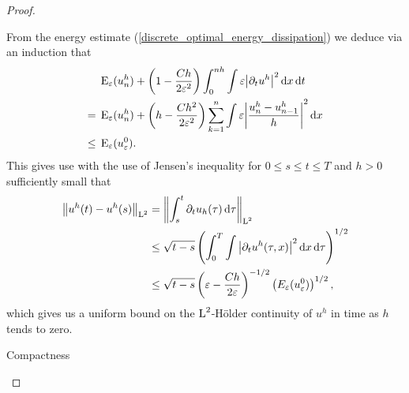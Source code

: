 \begin{proof}
\begin{description}[wide=0pt]
		From the energy estimate (\ref{discrete_optimal_energy_dissipation}) we deduce via an induction that
		\begin{align}
			& \operatorname{E}_{ \varepsilon } ( u_{ n }^{ h } )
			+
			\left(
			1
			-
			\frac{ C h  }{ 2 \varepsilon^{ 2 } }
			\right)
			\int_{ 0 }^{ n h }
			\int
			\varepsilon
			\abs{ \partial_{ t } u^{ h } }^{ 2 }
			\dd{ x }
			\dd{ t }
			\notag
			\\
			={} &
			\operatorname{E}_{ \varepsilon } ( u_{ n }^{ h } )
			+
			\left(
			h - \frac{ C h^{ 2 }}{ 2 \varepsilon^{ 2 } }
			\right)
			\sum_{k = 1 }^{ n }
			\int
			\varepsilon
			\abs{
				\frac{ u_{ n }^{ h } - u_{ n - 1 }^{ h } }{ h }
			}^{ 2 }
			\dd{ x }
			\notag
			\\
			\label{energy_and_time_derivative_bound}
			\leq {} &
			\operatorname{E}_{ \varepsilon } ( u_{ \varepsilon }^{ 0 } ).
		\end{align}
		This gives use with the use of Jensen's inequality for $ 0\leq s \leq t \leq T $ and $ h > 0 $ sufficiently small that
		\begin{align}
			\norm{ u^{ h } ( t ) - u^{ h } ( s ) }_{ \operatorname{L}^{ 2 } }
			& =
			\norm{ 
				\int_{ s }^{ t }
				\partial_{ t } u_{ h } ( \tau )
				\dd{ \tau }
			}_{ \operatorname{L}^{ 2 } }
			\notag
			\\
			& \leq
			\sqrt{ t - s }
			\left(	
			\int_{ 0 }^{ T }
			\int
			\abs{ \partial_{ t } u^{ h } ( \tau, x ) }^{ 2 }
			\dd{ x }
			\dd{ \tau }
			\right)^{ 1/2 }
			\notag
			\\
			\label{hölder_continuity_of_uh}
			& \leq
			\sqrt{ t - s }
			\left(
			\varepsilon - \frac{ C h }{ 2 \varepsilon }
			\right)^{ - 1/2 }
			\left(  E_{ \varepsilon } ( u_{ \varepsilon }^{ 0 } ) \right)^{ 1/ 2 },
		\end{align}
		which gives us a uniform bound on the $ \operatorname{L}^{ 2 }$-Hölder continuity of $ u^{ h } $ in time as $ h $ tends to zero.
		
		\item[Step 5:] Compactness
		

\end{description}
\end{proof}
